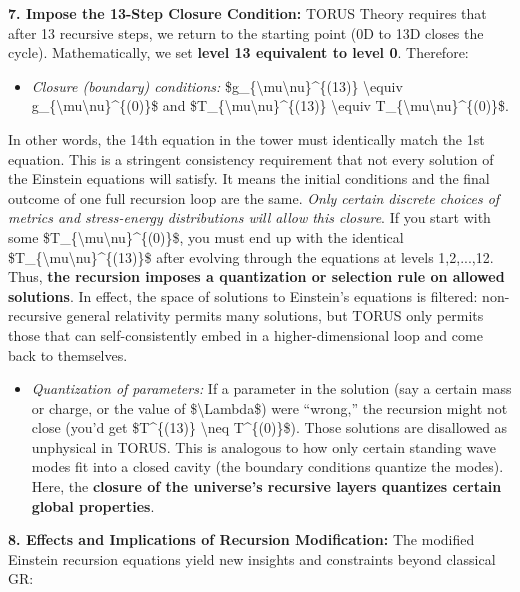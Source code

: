 \textbf{7. Impose the 13-Step Closure Condition:} TORUS Theory requires
that after 13 recursive steps, we return to the starting point (0D to
13D closes the cycle). Mathematically, we set \textbf{level 13
equivalent to level 0}. Therefore:

\begin{itemize}
\item
  \emph{Closure (boundary) conditions:}
  \$g\_\{\textbackslash{}mu\textbackslash{}nu\}\^{}\{(13)\}
  \textbackslash{}equiv
  g\_\{\textbackslash{}mu\textbackslash{}nu\}\^{}\{(0)\}\$ and
  \$T\_\{\textbackslash{}mu\textbackslash{}nu\}\^{}\{(13)\}
  \textbackslash{}equiv
  T\_\{\textbackslash{}mu\textbackslash{}nu\}\^{}\{(0)\}\$​.
\end{itemize}

In other words, the 14th equation in the tower must identically match
the 1st equation. This is a stringent consistency requirement that not
every solution of the Einstein equations will satisfy. It means the
initial conditions and the final outcome of one full recursion loop are
the same. \emph{Only certain discrete choices of metrics and
stress-energy distributions will allow this closure}. If you start with
some \$T\_\{\textbackslash{}mu\textbackslash{}nu\}\^{}\{(0)\}\$, you
must end up with the identical
\$T\_\{\textbackslash{}mu\textbackslash{}nu\}\^{}\{(13)\}\$ after
evolving through the equations at levels 1,2,...,12. Thus, \textbf{the
recursion imposes a quantization or selection rule on allowed
solutions}​. In effect, the space of solutions to Einstein's equations
is filtered: non-recursive general relativity permits many solutions,
but TORUS only permits those that can self-consistently embed in a
higher-dimensional loop and come back to themselves.

\begin{itemize}
\item
  \emph{Quantization of parameters:} If a parameter in the solution (say
  a certain mass or charge, or the value of \$\textbackslash{}Lambda\$)
  were ``wrong,'' the recursion might not close (you'd get
  \$T\^{}\{(13)\} \textbackslash{}neq T\^{}\{(0)\}\$). Those solutions
  are disallowed as unphysical in TORUS. This is analogous to how only
  certain standing wave modes fit into a closed cavity (the boundary
  conditions quantize the modes). Here, the \textbf{closure of the
  universe's recursive layers quantizes certain global properties}.
\end{itemize}

\textbf{8. Effects and Implications of Recursion Modification:} The
modified Einstein recursion equations yield new insights and constraints
beyond classical GR:

